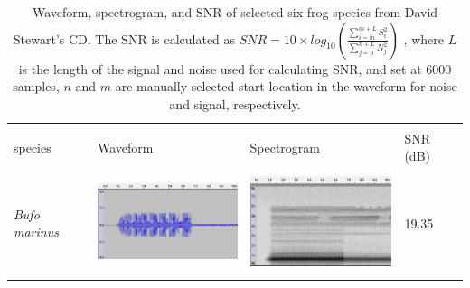 
\begin{table}[htb!]
\centering
\caption[Waveform, spectrogram, and SNR of CD]{Waveform, spectrogram, and SNR of selected six frog species from David Stewart's CD. The SNR is calculated as 
$SNR=10 \times log_{10}(\frac{\sum_{i=m}^{m+L}S_{i}^2}{\sum_{j=n}^{n+L}N_{j}^2})$
, where $L$ is the length of the signal and noise used for calculating SNR, and set at 6000 samples, $n$ and $m$ are manually selected start location in the waveform for noise and signal, respectively.}
\label{tab:wav_spec_cd}
\begin{tabular}{llll}
\hline\hline
\backslashbox{Frog \\ species}{}        & Waveform & Spectrogram & SNR (dB)   \\ \hline
\textit{Bufo marinus}        &   
\begin{minipage}{.3\textwidth} \includegraphics[width=45mm, height=30mm]{image/Ch1/toad_wave.png}  \end{minipage}    &   \begin{minipage}{.3\textwidth} \includegraphics[width=45mm, height=30mm]{image/Ch1/toad_spec.png}  \end{minipage}          & 19.35 \\ \hline

\end{tabular}
\end{table}
